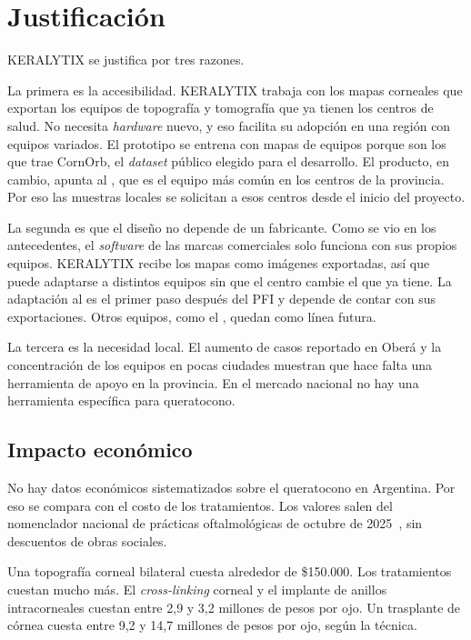 \section{Justificación}

    KERALYTIX se justifica por tres razones.

    La primera es la accesibilidad. KERALYTIX trabaja con los mapas corneales que exportan los equipos de topografía y tomografía que ya tienen los centros de salud. No necesita \textit{hardware} nuevo, y eso facilita su adopción en una región con equipos variados. El prototipo se entrena con mapas de equipos \Orbscan{} porque son los que trae CornOrb, el \textit{dataset} público elegido para el desarrollo. El producto, en cambio, apunta al \Pentacam{}, que es el equipo más común en los centros de la provincia. Por eso las muestras locales se solicitan a esos centros desde el inicio del proyecto.

    La segunda es que el diseño no depende de un fabricante. Como se vio en los antecedentes, el \textit{software} de las marcas comerciales solo funciona con sus propios equipos. KERALYTIX recibe los mapas como imágenes exportadas, así que puede adaptarse a distintos equipos sin que el centro cambie el que ya tiene. La adaptación al \Pentacam{} es el primer paso después del PFI y depende de contar con sus exportaciones. Otros equipos, como el \Sirius{}, quedan como línea futura.

    La tercera es la necesidad local. El aumento de casos reportado en Oberá y la concentración de los equipos en pocas ciudades muestran que hace falta una herramienta de apoyo en la provincia. En el mercado nacional no hay una herramienta específica para queratocono.

    \subsection*{Impacto económico}

        No hay datos económicos sistematizados sobre el queratocono en Argentina. Por eso se compara con el costo de los tratamientos. Los valores salen del nomenclador nacional de prácticas oftalmológicas de octubre de 2025~\cite{nomenclador_cao}, sin descuentos de obras sociales.

        Una topografía corneal bilateral cuesta alrededor de \$150.000. Los tratamientos cuestan mucho más. El \textit{cross-linking} corneal y el implante de anillos intracorneales cuestan entre 2,9 y 3,2 millones de pesos por ojo. Un trasplante de córnea cuesta entre 9,2 y 14,7 millones de pesos por ojo, según la técnica.

